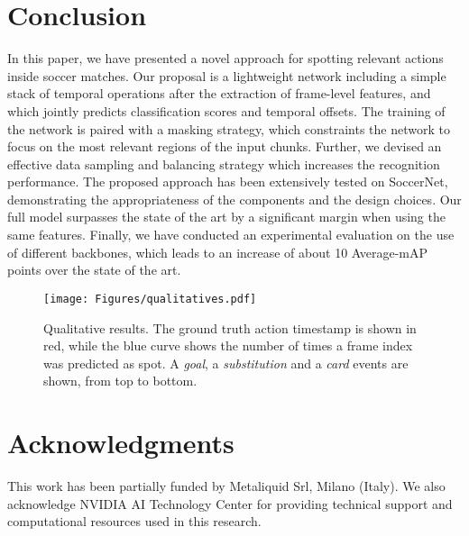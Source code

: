 \documentclass[a4paper,conference]{IEEEtran}
\begin{document}
\section{Conclusion}
In this paper, we have presented a novel approach for spotting relevant actions inside soccer matches. Our proposal is a lightweight network including a simple stack of temporal operations after the extraction of frame-level features, and which jointly predicts classification scores and temporal offsets. The training of the network is paired with a masking strategy, which constraints the network to focus on the most relevant regions of the input chunks. Further, we devised an effective data sampling and balancing strategy which increases the recognition performance. The proposed approach has been extensively tested on SoccerNet, demonstrating the appropriateness of the components and the design choices. Our full model surpasses the state of the art by a significant margin when using the same features. Finally, we have conducted an experimental evaluation on the use of different backbones, which leads to an increase of about 10 Average-mAP points over the state of the art.

\begin{figure}[t]
\centering
\texttt{[image: Figures/qualitatives.pdf]}
\caption{Qualitative results. The ground truth action timestamp is shown in red, while the blue curve shows the number of times a frame index was predicted as spot. A \textit{goal}, a \textit{substitution} and a \textit{card} events are shown, from top to bottom.}
\label{fig:qualitatives}
\end{figure}

\section*{Acknowledgments}
This work has been partially funded by Metaliquid Srl, Milano (Italy). We also acknowledge NVIDIA AI Technology Center for providing technical support and computational resources used in this research.

















\balance

\end{document}
